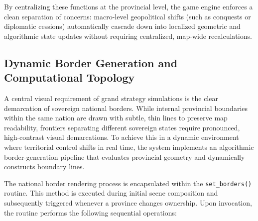 By centralizing these functions at the provincial level, the game engine enforces a clean separation of concerns: macro-level geopolitical shifts (such as conquests or diplomatic cessions) automatically cascade down into localized geometric and algorithmic state updates without requiring centralized, map-wide recalculations.

\subsection{Dynamic Border Generation and Computational Topology}
\label{subsec:dynamic_borders}

A central visual requirement of grand strategy simulations is the clear demarcation of sovereign national borders. While internal provincial boundaries within the same nation are drawn with subtle, thin lines to preserve map readability, frontiers separating different sovereign states require pronounced, high-contrast visual demarcations. To achieve this in a dynamic environment where territorial control shifts in real time, the system implements an algorithmic border-generation pipeline that evaluates provincial geometry and dynamically constructs boundary lines.

The national border rendering process is encapsulated within the \texttt{set\_borders()} routine. This method is executed during initial scene composition and subsequently triggered whenever a province changes ownership. Upon invocation, the routine performs the following sequential operations:

